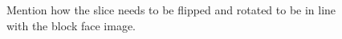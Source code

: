     \begin{figure}[htbp]
      \centering
      \caption{Mention how the slice needs to be flipped and rotated to be in line with the block face image.}
      \label{fig:original_images}
    \end{figure}
    
